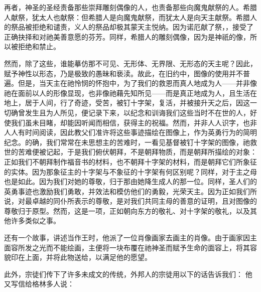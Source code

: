 再者，神圣的圣经责备那些崇拜雕刻偶像的人，也责备那些向魔鬼献祭的人。希腊人献祭，犹太人也献祭：但希腊人是向魔鬼献祭，而犹太人是向天主献祭。希腊人的祭品被拒绝和谴责，义人的祭品却极其蒙天主悦纳。因为诺厄献了祭，，接受了正确抉择和对祂美善意愿的芬芳。同样，希腊人的雕刻偶像，因为是神祇的像，所以被拒绝和禁止。\par

然而，除了这些，谁能摹仿那不可见、无形体、无界限、无形态的天主呢？因此，赋予神性以形态，乃是极致的愚昧和亵渎。故此，在旧约中，图像的使用并不普遍。但是，当天主在祂怜悯的怀抱中，为了我们的救恩而真人地成为人——并非像祂在面前以人的形像显现，也非像祂藉先知所见——而是真正地成为人，且生活在地上，居于人间，行了奇迹，受苦，被钉十字架，复活，并被接升天之后，因这一切确曾发生且为人所见，便记录下来，以纪念和训诲我们这些当时不在世的人，好使我们虽未目睹，却能因听闻而相信，获得主的祝福。然而，并非人人识字，也非人人有时间阅读，因此教父们准许将这些事迹描绘在图像上，作为英勇行为的简明纪念。的确，我们常常在未思想主的苦难时，一看见基督被钉十字架的图像，祂救世的苦难便被记起，于是我们俯伏朝拜，不是朝拜物质，而是朝拜所描绘的对象：正如我们不朝拜制作福音书的材料，也不朝拜十字架的材料，而是朝拜它们所象征的实体。因为那象征主的十字架与不象征的十字架有何区别呢？同样，对于主之母也是如此。因为我们对她的尊敬，归于那由她降生成人的那一位。同样，圣人们的英勇事迹也激励我们勇敢，并效法和模仿他们的勇毅，光荣天主。因为正如我们所说，对最卓越的同仆所表示的尊敬，是对我们共同主母的善意的证明，且对图像的尊敬归于原型。然而，这是一项，正如朝向东方的敬礼、对十字架的敬礼，以及其他许多类似之事。\par

还有一个故事，讲述当作王时，他派了一位肖像画家去画主的肖像。由于画家因主面容所发之光而不能绘画，主便将一块布覆在祂神圣而赋予生命的面容上，将其容貌印在上面，并将此物送给，以满足他的愿望。\par

此外，宗徒们传下了许多未成文的传统，外邦人的宗徒用以下的话告诉我们： 他又写信给格林多人说：\par


